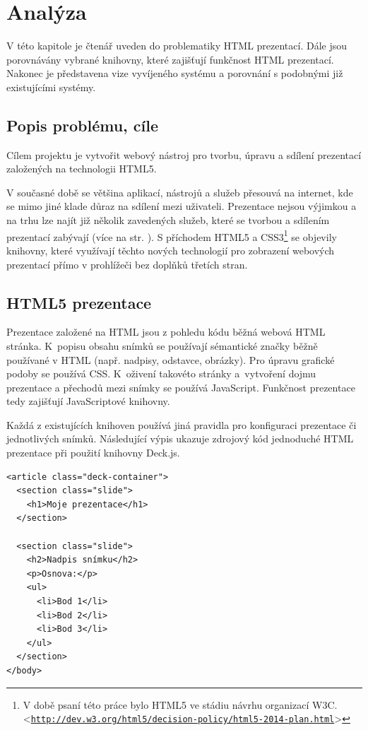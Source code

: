 \documentclass[11pt,twoside,a4paper]{book}
\let\oldUrl\url									%
\renewcommand\url[1]{<\texttt{\oldUrl{#1}}>}
\begin{document}
\chapter{Analýza}
V této kapitole je čtenář uveden do problematiky HTML prezentací. Dále jsou porovnávány vybrané knihovny, které zajišťují funkčnost HTML prezentací. Nakonec je představena vize vyvíjeného systému a porovnání s podobnými již existujícími systémy.

\section{Popis problému, cíle}
Cílem projektu je vytvořit webový nástroj pro tvorbu, úpravu a sdílení prezentací založených na technologii HTML5.

V současné době se většina aplikací, nástrojů a služeb přesouvá na internet, kde se mimo jiné klade důraz na sdílení mezi uživateli. Prezentace nejsou výjimkou a na trhu lze najít již několik zavedených služeb, které se tvorbou a sdílením prezentací zabývají (více na str. \pageref{chap:existujiciSystemy}). S příchodem HTML5 a CSS3\footnote{V době psaní této práce bylo HTML5 ve stádiu návrhu organizací W3C. \url{http://dev.w3.org/html5/decision-policy/html5-2014-plan.html}} se objevily knihovny, které využívají těchto nových technologií pro zobrazení webových prezentací přímo v prohlížeči bez doplňků třetích stran. 

\section{HTML5 prezentace}
Prezentace založené na HTML jsou z pohledu kódu běžná webová HTML stránka. K~popisu obsahu snímků se používají sémantické značky běžně používané v HTML (např. nadpisy, odstavce, obrázky). Pro úpravu grafické podoby se používá CSS. K~oživení takovéto stránky a~vytvoření dojmu prezentace a přechodů mezi snímky se používá JavaScript. Funkčnost prezentace tedy zajišťují JavaScriptové knihovny.

Každá z existujících knihoven používá jiná pravidla pro konfiguraci prezentace či jednotlivých snímků. Následující výpis ukazuje zdrojový kód jednoduché HTML prezentace při použití knihovny Deck.js.

\begin{lstlisting}[caption=Ukázka zdrojového kódu HTML prezentace (Deck.js)]
<article class="deck-container">
  <section class="slide">
    <h1>Moje prezentace</h1>
  </section>

  <section class="slide">
    <h2>Nadpis snímku</h2>
    <p>Osnova:</p>
    <ul>
      <li>Bod 1</li>
      <li>Bod 2</li>
      <li>Bod 3</li>
    </ul>
  </section>
</body>
\end{lstlisting}
\end{document}
